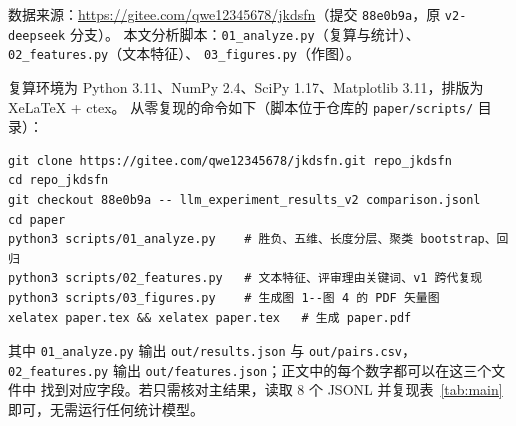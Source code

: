 \documentclass[UTF8,11pt,a4paper]{ctexart}
\begin{document}
\vspace{0.5em}
\noindent\small
数据来源：\url{https://gitee.com/qwe12345678/jkdsfn}（提交 \texttt{88e0b9a}，原 \texttt{v2-deepseek} 分支）。
本文分析脚本：\texttt{01\_analyze.py}（复算与统计）、\texttt{02\_features.py}（文本特征）、
\texttt{03\_figures.py}（作图）。

\vspace{0.6em}
\noindent 复算环境为 Python 3.11、NumPy 2.4、SciPy 1.17、Matplotlib 3.11，排版为 XeLaTeX + ctex。
从零复现的命令如下（脚本位于仓库的 \texttt{paper/scripts/} 目录）：

\begin{verbatim}
git clone https://gitee.com/qwe12345678/jkdsfn.git repo_jkdsfn
cd repo_jkdsfn
git checkout 88e0b9a -- llm_experiment_results_v2 comparison.jsonl
cd paper
python3 scripts/01_analyze.py    # 胜负、五维、长度分层、聚类 bootstrap、回归
python3 scripts/02_features.py   # 文本特征、评审理由关键词、v1 跨代复现
python3 scripts/03_figures.py    # 生成图 1--图 4 的 PDF 矢量图
xelatex paper.tex && xelatex paper.tex   # 生成 paper.pdf
\end{verbatim}

\noindent 其中 \texttt{01\_analyze.py} 输出 \texttt{out/results.json} 与 \texttt{out/pairs.csv}，\\
\texttt{02\_features.py} 输出 \texttt{out/features.json}；正文中的每个数字都可以在这三个文件中
找到对应字段。若只需核对主结果，读取 8 个 JSONL 并复现表~\ref{tab:main} 即可，无需运行任何统计模型。
\end{document}
